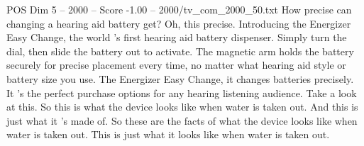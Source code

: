 \begin{textsample}{POS Dim 5 – 2000 – Score -1.00 – 2000/tv\_com\_2000\_50.txt}  \label{ex:f5_pos_070}
How precise can changing a hearing aid battery get?
Oh, this precise.
Introducing the Energizer Easy Change, the world 's first hearing aid battery dispenser.
Simply turn the dial, then slide the battery out to activate.
The magnetic arm holds the battery securely for precise placement every time, no matter what hearing aid style or battery size you use.
The Energizer Easy Change, it changes batteries precisely.
It 's the perfect purchase options for any hearing listening audience.
Take a look at this.
So this is what the device looks like when water is taken out.
And this is just what it 's made of.
So these are the facts of what the device looks like when water is taken out.
This is just what it looks like when water is taken out.

\end{textsample}
